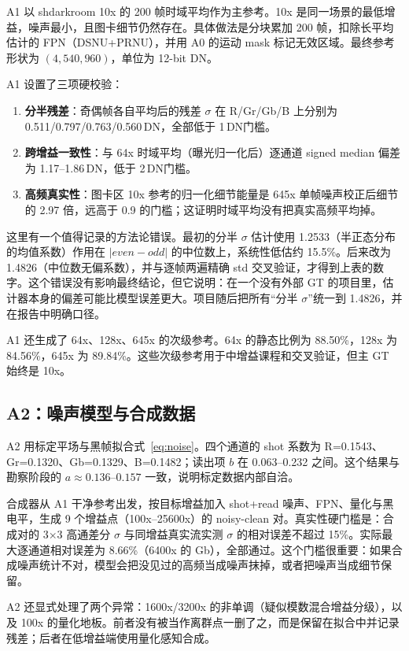\documentclass[11pt,a4paper,UTF8,fontset=fandol]{ctexart}
\newcommand{\dn}{\ensuremath{\,\mathrm{DN}}}
\begin{document}
A1 以 shdarkroom 10x 的 200 帧时域平均作为主参考。10x 是同一场景的最低增益，噪声最小，且图卡细节仍然存在。具体做法是分块累加 200 帧，扣除长平均估计的 FPN（DSNU+PRNU），并用 A0 的运动 mask 标记无效区域。最终参考形状为 $(4,540,960)$，单位为 12-bit DN。

A1 设置了三项硬校验：

\begin{enumerate}
  \item \textbf{分半残差}：奇偶帧各自平均后的残差 $\sigma$ 在 R/Gr/Gb/B 上分别为 0.511/0.797/0.763/0.560\dn，全部低于 1\dn 门槛。
  \item \textbf{跨增益一致性}：与 64x 时域平均（曝光归一化后）逐通道 signed median 偏差为 1.17--1.86\dn，低于 2\dn 门槛。
  \item \textbf{高频真实性}：图卡区 10x 参考的归一化细节能量是 645x 单帧噪声校正后细节的 2.97 倍，远高于 0.9 的门槛；这证明时域平均没有把真实高频平均掉。
\end{enumerate}

这里有一个值得记录的方法论错误。最初的分半 $\sigma$ 估计使用 1.2533（半正态分布的均值系数）作用在 $|even-odd|$ 的中位数上，系统性低估约 15.5\%。后来改为 1.4826（中位数无偏系数），并与逐帧两遍精确 std 交叉验证，才得到上表的数字。这个错误没有影响最终结论，但它说明：在一个没有外部 GT 的项目里，估计器本身的偏差可能比模型误差更大。项目随后把所有“分半 $\sigma$”统一到 1.4826，并在报告中明确口径。

A1 还生成了 64x、128x、645x 的次级参考。64x 的静态比例为 88.50\%，128x 为 84.56\%，645x 为 89.84\%。这些次级参考用于中增益课程和交叉验证，但主 GT 始终是 10x。

\subsection{A2：噪声模型与合成数据}

A2 用标定平场与黑帧拟合式~\eqref{eq:noise}。四个通道的 shot 系数为 R=0.1543、Gr=0.1320、Gb=0.1329、B=0.1482；读出项 $b$ 在 0.063--0.232 之间。这个结果与勘察阶段的 $a\approx0.136$--$0.157$ 一致，说明标定数据内部自洽。

合成器从 A1 干净参考出发，按目标增益加入 shot+read 噪声、FPN、量化与黑电平，生成 9 个增益点（100x--25600x）的 noisy-clean 对。真实性硬门槛是：合成对的 3$\times$3 高通差分 $\sigma$ 与同增益真实流实测 $\sigma$ 的相对误差不超过 15\%。实际最大逐通道相对误差为 8.66\%（6400x 的 Gb），全部通过。这个门槛很重要：如果合成噪声统计不对，模型会把没见过的高频当成噪声抹掉，或者把噪声当成细节保留。

A2 还显式处理了两个异常：1600x/3200x 的非单调（疑似模数混合增益分级），以及 100x 的量化地板。前者没有被当作离群点一删了之，而是保留在拟合中并记录残差；后者在低增益端使用量化感知合成。
\end{document}
